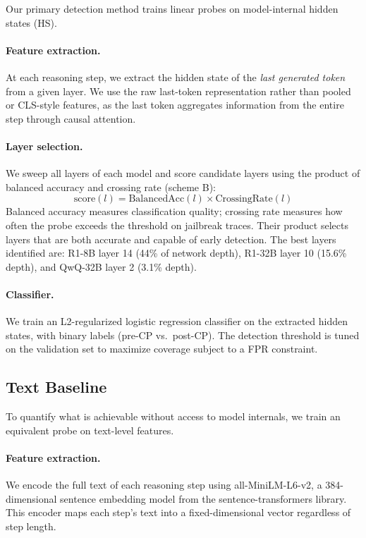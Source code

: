 Our primary detection method trains linear probes on model-internal hidden states (HS).

\paragraph{Feature extraction.} At each reasoning step, we extract the hidden state of the \emph{last generated token} from a given layer. We use the raw last-token representation rather than pooled or CLS-style features, as the last token aggregates information from the entire step through causal attention.

\paragraph{Layer selection.} We sweep all layers of each model and score candidate layers using the product of balanced accuracy and crossing rate (scheme B):
\begin{equation}
    \text{score}(l) = \text{BalancedAcc}(l) \times \text{CrossingRate}(l)
\end{equation}
Balanced accuracy measures classification quality; crossing rate measures how often the probe exceeds the threshold on jailbreak traces. Their product selects layers that are both accurate and capable of early detection. The best layers identified are: R1-8B layer 14 (44\% of network depth), R1-32B layer 10 (15.6\% depth), and QwQ-32B layer 2 (3.1\% depth).

\paragraph{Classifier.} We train an L2-regularized logistic regression classifier on the extracted hidden states, with binary labels (pre-CP vs.\ post-CP). The detection threshold is tuned on the validation set to maximize coverage subject to a FPR constraint.

\subsection{Text Baseline}
\label{sec:text-baseline}

To quantify what is achievable without access to model internals, we train an equivalent probe on text-level features.

\paragraph{Feature extraction.} We encode the full text of each reasoning step using all-MiniLM-L6-v2, a 384-dimensional sentence embedding model from the sentence-transformers library. This encoder maps each step's text into a fixed-dimensional vector regardless of step length.

